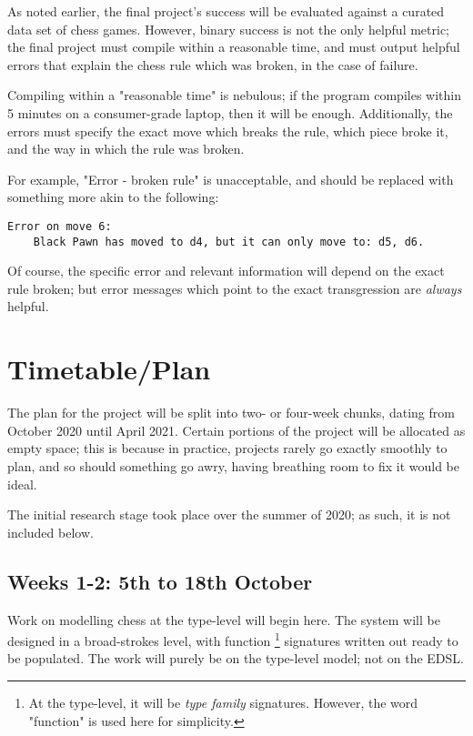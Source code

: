 \documentclass[12pt, a4paper]{scrartcl}
\begin{document}
As noted earlier, the final project's success will be evaluated against a curated data set of chess games. However, binary success is not the only helpful metric; the final project must compile within a reasonable time, and must output helpful errors that explain the chess rule which was broken, in the case of failure.

Compiling within a "reasonable time" is nebulous; if the program compiles within 5 minutes on a consumer-grade laptop, then it will be enough. Additionally, the errors must specify the exact move which breaks the rule, which piece broke it, and the way in which the rule was broken.

For example, "Error - broken rule" is unacceptable, and should be replaced with something more akin to the following:

\begin{lstlisting}
Error on move 6:
    Black Pawn has moved to d4, but it can only move to: d5, d6.
\end{lstlisting}

Of course, the specific error and relevant information will depend on the exact rule broken; but error messages which point to the exact transgression are \emph{always} helpful.

\section{Timetable/Plan}

The plan for the project will be split into two- or four-week chunks, dating from October 2020 until April 2021. Certain portions of the project will be allocated as empty space; this is because in practice, projects rarely go exactly smoothly to plan, and so should something go awry, having breathing room to fix it would be ideal.

The initial research stage took place over the summer of 2020; as such, it is not included below.

\subsection{Weeks 1-2: 5th to 18th October}

Work on modelling chess at the type-level will begin here. The system will be designed in a broad-strokes level, with function \footnote{At the type-level, it will be \emph{type family} signatures. However, the word "function" is used here for simplicity.} signatures written out ready to be populated. The work will purely be on the type-level model; not on the EDSL.
\end{document}
